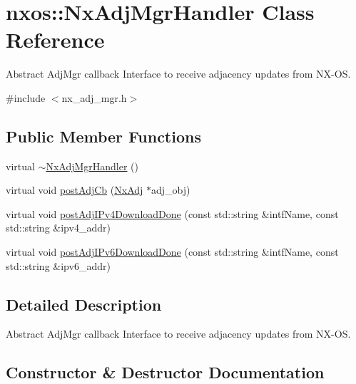 \hypertarget{classnxos_1_1_nx_adj_mgr_handler}{}\section{nxos\+:\+:Nx\+Adj\+Mgr\+Handler Class Reference}
\label{classnxos_1_1_nx_adj_mgr_handler}


Abstract Adj\+Mgr callback Interface to receive adjacency updates from N\+X-\/\+OS.  




{\ttfamily \#include $<$nx\+\_\+adj\+\_\+mgr.\+h$>$}

\subsection*{Public Member Functions}
\begin{DoxyCompactItemize}
\item 
virtual \mbox{\hyperlink{classnxos_1_1_nx_adj_mgr_handler_a59d38c9a0449f5e0f0de25c26f9b7c99}{$\sim$\+Nx\+Adj\+Mgr\+Handler}} ()
\item 
virtual void \mbox{\hyperlink{classnxos_1_1_nx_adj_mgr_handler_a9a1f85f218eab71d9c280088f69a14dc}{post\+Adj\+Cb}} (\mbox{\hyperlink{classnxos_1_1_nx_adj}{Nx\+Adj}} $\ast$adj\+\_\+obj)
\item 
virtual void \mbox{\hyperlink{classnxos_1_1_nx_adj_mgr_handler_a84d9b92c976ae528c72e93ab3a75ecd1}{post\+Adj\+I\+Pv4\+Download\+Done}} (const std\+::string \&intf\+Name, const std\+::string \&ipv4\+\_\+addr)
\item 
virtual void \mbox{\hyperlink{classnxos_1_1_nx_adj_mgr_handler_af187f3d933d1b58547447004e4aebef6}{post\+Adj\+I\+Pv6\+Download\+Done}} (const std\+::string \&intf\+Name, const std\+::string \&ipv6\+\_\+addr)
\end{DoxyCompactItemize}


\subsection{Detailed Description}
Abstract Adj\+Mgr callback Interface to receive adjacency updates from N\+X-\/\+OS. 

\subsection{Constructor \& Destructor Documentation}
\mbox{\label{classnxos_1_1_nx_adj_mgr_handler_a59d38c9a0449f5e0f0de25c26f9b7c99}} 
